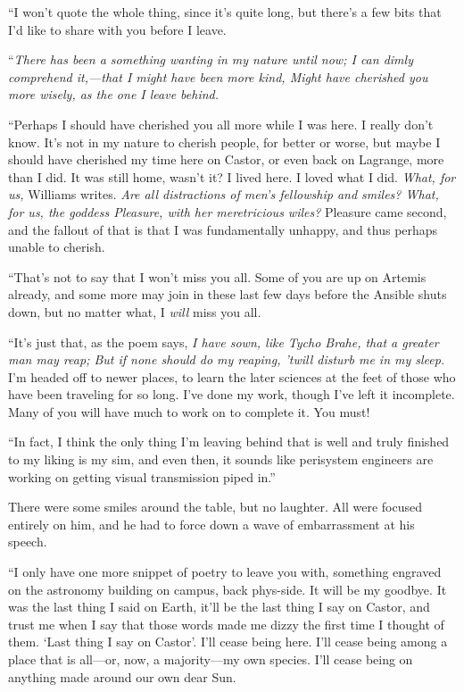 ``I won't quote the whole thing, since it's quite long, but there's a few bits that I'd like to share with you before I leave.

``\emph{There has been a something wanting in my nature until now; I can dimly comprehend it,—that I might have been more kind, Might have cherished you more wisely, as the one I leave behind.}

``Perhaps I should have cherished you all more while I was here. I really don't know. It's not in my nature to cherish people, for better or worse, but maybe I should have cherished my time here on Castor, or even back on Lagrange, more than I did. It was still home, wasn't it? I lived here. I loved what I did. \emph{What, for us,} Williams writes.   \emph{Are all distractions of men's fellowship and smiles? What, for us, the goddess Pleasure, with her meretricious wiles?} Pleasure came second, and the fallout of that is that I was fundamentally unhappy, and thus perhaps unable to cherish.

``That's not to say that I won't miss you all. Some of you are up on Artemis already, and some more may join in these last few days before the Ansible shuts down, but no matter what, I \emph{will} miss you all.

``It's just that, as the poem says, \emph{I have sown, like Tycho Brahe, that a greater man may reap; But if none should do my reaping, 'twill disturb me in my sleep.} I'm headed off to newer places, to learn the later sciences at the feet of those who have been traveling for so long. I've done my work, though I've left it incomplete. Many of you will have much to work on to complete it. You must!

``In fact, I think the only thing I'm leaving behind that is well and truly finished to my liking is my sim, and even then, it sounds like perisystem engineers are working on getting visual transmission piped in.''

There were some smiles around the table, but no laughter. All were focused entirely on him, and he had to force down a wave of embarrassment at his speech.

``I only have one more snippet of poetry to leave you with, something engraved on the astronomy building on campus, back phys-side. It will be my goodbye. It was the last thing I said on Earth, it'll be the last thing I say on Castor, and trust me when I say that those words made me dizzy the first time I thought of them. `Last thing I say on Castor'. I'll cease being here. I'll cease being among a place that is all—or, now, a majority—my own species. I'll cease being on anything made around our own dear Sun.

